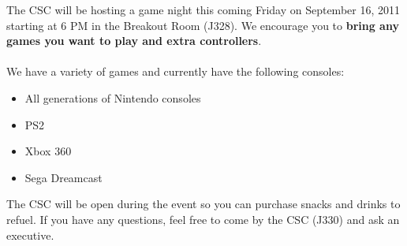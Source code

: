 \documentclass{article}
\begin{document}


The CSC will be hosting a game night this coming Friday on September
16, 2011 starting at 6 PM in the Breakout Room (J328). We encourage you
to \textbf{bring any games you want to play and extra controllers}.\\
\\
We have a variety of games and currently have the following consoles:
\begin{itemize}
\item All generations of Nintendo consoles
\item PS2
\item Xbox 360
\item Sega Dreamcast
\end{itemize}

The CSC will be open during the event so you can purchase
snacks and drinks to refuel. If you have any questions, feel free to come by
the CSC (J330) and ask an executive.

\end{document}
